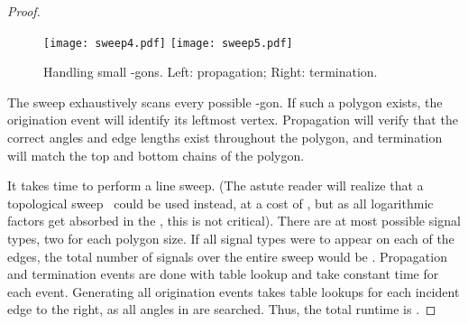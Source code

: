 \documentclass{article}
\newtheorem{lemma}{Lemma}
\newtheorem{defini}{Definition}
\begin{document}
\begin{proof}
\begin{figure}[h!]
\center
\texttt{[image: sweep4.pdf]}
\texttt{[image: sweep5.pdf]}
\caption{Handling small -gons.  Left: propagation;  Right: termination.}
\label{smallgons}
\end{figure}


The sweep exhaustively scans every possible -gon.
If such a polygon exists, the origination event will identify its leftmost vertex.
Propagation will verify that the correct angles and edge lengths exist throughout
the polygon, and termination will match the top and bottom chains of the polygon.

 It takes  time to perform a line
sweep. (The astute reader will realize that a topological sweep~\cite{sweep} could be
used instead, at a cost of , but as all logarithmic factors get absorbed in 
the , this is not critical). 
There are at most  possible signal types, two for each polygon size.
If all signal types were to appear on each of the  edges, the total number of signals 
 over the entire sweep would be .
Propagation and termination events are done with table lookup and take constant time for each event. Generating all
origination events takes  table lookups for each incident edge to the right,
as all angles in  are searched. Thus, the total runtime is .
\end{proof}


\begin{comment}
\begin{defini}
A \emph{prime-skip triangle} is an isosceles triangle formed by three vertices 
of a regular -gon .  Furthermore,  the two non-apex
vertices (defining the base)
are at a prime number of vertices away from each other in .
\end{defini}
\begin{lemma}
A prime-skip triangle defines a unique  -gon ,  the description of which can be
determined in  time. 
\end{lemma}
\begin{proof}
The simplest way to determine which one it is in constant time is to build a lookup table of size . If we do not allow hashing, a logarithmic factor is added as we have to look in a binary search tree.
\end{proof}
\noindent The following follows directly from the {\em prime number theorem} (Gauss, 1792;
see~\cite{havil}):
\begin{lemma}
\label{obs1}
A random isosceles triangle chosen from a given regular -gon  will be prime-skip with probability
.
\end{lemma}
\begin{proof}
Each vertex of  has the same chance of being the apex of a random isosceles triangle.
Without loss of generality, choose the ``topmost" vertex of an axis-symmetric -gon as the apex.  Any isosceles triangle will have a horizontal base.
The vertex-distance (measured in ) from apex to non-apex is a uniform distribution from 1
to , with the exception of the equilateral triangle that is triple-counted
(it will also be selected if the apex is different).
\end{proof}
\end{comment}
\end{document}
